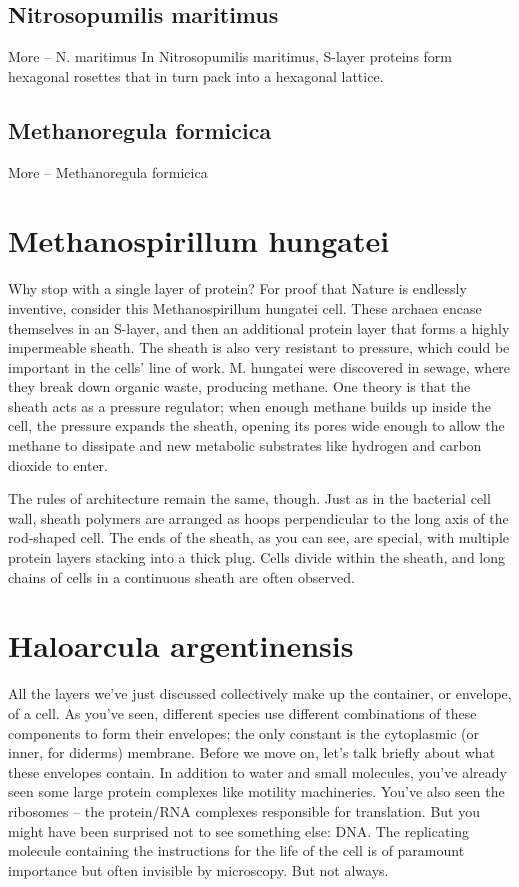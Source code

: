\documentclass[]{book}
\begin{document}
\subsection{Nitrosopumilis maritimus}\label{nitrosopumilis-maritimus}

More -- N. maritimus In Nitrosopumilis maritimus, S-layer proteins form
hexagonal rosettes that in turn pack into a hexagonal lattice.

\subsection{Methanoregula formicica}\label{methanoregula-formicica}

More -- Methanoregula formicica

\section{Methanospirillum hungatei}\label{methanospirillum-hungatei}

Why stop with a single layer of protein? For proof that Nature is
endlessly inventive, consider this Methanospirillum hungatei cell. These
archaea encase themselves in an S-layer, and then an additional protein
layer that forms a highly impermeable sheath. The sheath is also very
resistant to pressure, which could be important in the cells' line of
work. M. hungatei were discovered in sewage, where they break down
organic waste, producing methane. One theory is that the sheath acts as
a pressure regulator; when enough methane builds up inside the cell, the
pressure expands the sheath, opening its pores wide enough to allow the
methane to dissipate and new metabolic substrates like hydrogen and
carbon dioxide to enter.

The rules of architecture remain the same, though. Just as in the
bacterial cell wall, sheath polymers are arranged as hoops perpendicular
to the long axis of the rod-shaped cell. The ends of the sheath, as you
can see, are special, with multiple protein layers stacking into a thick
plug. Cells divide within the sheath, and long chains of cells in a
continuous sheath are often observed.

\section{Haloarcula argentinensis}\label{haloarcula-argentinensis}

All the layers we've just discussed collectively make up the container,
or envelope, of a cell. As you've seen, different species use different
combinations of these components to form their envelopes; the only
constant is the cytoplasmic (or inner, for diderms) membrane. Before we
move on, let's talk briefly about what these envelopes contain. In
addition to water and small molecules, you've already seen some large
protein complexes like motility machineries. You've also seen the
ribosomes -- the protein/RNA complexes responsible for translation. But
you might have been surprised not to see something else: DNA. The
replicating molecule containing the instructions for the life of the
cell is of paramount importance but often invisible by microscopy. But
not always.
\end{document}
